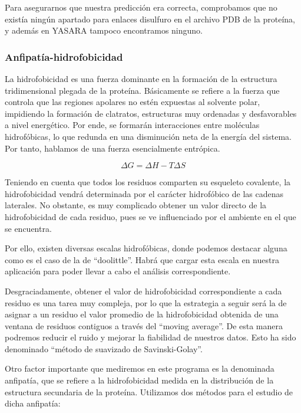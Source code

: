 \documentclass[12pt]{article}
\begin{document}
Para asegurarnos que nuestra predicción era correcta, comprobamos que no existía ningún apartado para enlaces disulfuro en el archivo PDB de la proteína, y además en YASARA tampoco encontramos ninguno.

\subsubsection{Anfipatía-hidrofobicidad}
La hidrofobicidad es una fuerza dominante en la formación de la estructura tridimensional plegada de la proteína. Básicamente se refiere a la fuerza que controla que las regiones apolares no estén expuestas al solvente polar, impidiendo la formación de clatratos, estructuras muy ordenadas y desfavorables a nivel energético. Por ende, se formarán interacciones entre moléculas hidrofóbicas, lo que redunda en una disminución neta de la energía del sistema. Por tanto, hablamos de una fuerza esencialmente entrópica. 

\begin{equation}
\Delta{G}=\Delta{H} - T\Delta{S}
\end{equation}
\newline

Teniendo en cuenta que todos los residuos comparten su esqueleto covalente, la hidrofobicidad vendrá determinada por el carácter hidrofóbico de las cadenas laterales. No obstante, es muy complicado obtener un valor directo de la hidrofobicidad de cada residuo, pues se ve influenciado por el ambiente en el que se encuentra.
\newline

Por ello, existen diversas escalas hidrofóbicas, donde podemos destacar alguna como es el caso de la de ``doolittle''. Habrá que cargar esta escala en nuestra aplicación para poder llevar a cabo el análisis correspondiente.
\newline

Desgraciadamente, obtener el valor de hidrofobicidad correspondiente a cada residuo es una tarea muy compleja, por lo que la estrategia a seguir será la de asignar a un residuo el valor promedio de la hidrofobicidad obtenida de una ventana de residuos contiguos a través del ``moving average''. De esta manera podremos reducir el ruido y mejorar la fiabilidad de nuestros datos. Esto ha sido denominado ``método de suavizado de Savinski-Golay''.
\newline


Otro factor importante que mediremos en este programa es la denominada anfipatía, que se refiere a la hidrofobicidad medida en la distribución de la estructura secundaria de la proteína. Utilizamos dos métodos para el estudio de dicha anfipatía:
\end{document}
